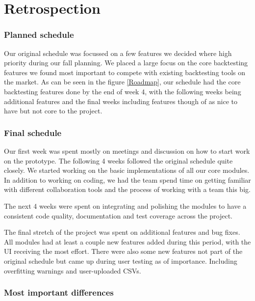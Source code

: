\documentclass[main.tex]{subfiles}
\begin{document}
\section{Retrospection}\label{retro}

\subsubsection{Planned schedule}\label{planned-schedule}

Our original schedule was focussed on a few features we decided where
high priority during our fall planning. We placed a large focus on the
core backtesting features we found most important to compete with
existing backtesting tools on the market. As can be seen in the figure
\ref{Roadmap}, our schedule had the core backtesting features done by
the end of week 4, with the following weeks being additional features
and the final weeks including features though of as nice to have but not
core to the project.

\subsubsection{Final schedule}\label{final-schedule}

Our first week was spent mostly on meetings and discussion on how to
start work on the prototype. The following 4 weeks followed the original
schedule quite closely. We started working on the basic implementations
of all our core modules. In addition to working on coding, we had the
team spend time on getting familiar with different collaboration tools
and the process of working with a team this big.

The next 4 weeks were spent on integrating and polishing the modules to
have a consistent code quality, documentation and test coverage across
the project.

The final stretch of the project was spent on additional features and
bug fixes. All modules had at least a couple new features added during
this period, with the UI receiving the most effort. There were also some
new features not part of the original schedule but came up during user
testing as of importance. Including overfitting warnings and
user-uploaded CSVs.

\subsubsection{Most important
differences}\label{most-important-differences}
\end{document}
